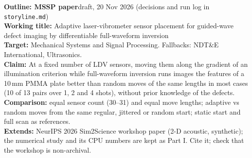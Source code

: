 \documentclass[10pt]{article}
\begin{document}
{\Large\bfseries Outline: MSSP paper}\hfill{\small draft, 20 Nov 2026 (decisions and run log in \texttt{storyline.md})}\\[2pt]
\textbf{Working title:} Adaptive laser-vibrometer sensor placement for guided-wave defect imaging by differentiable full-waveform inversion\\
\textbf{Target:} Mechanical Systems and Signal Processing. Fallbacks: NDT\&E International, Ultrasonics.\\
\textbf{Claim:} At a fixed number of LDV sensors, moving them along the gradient of an illumination criterion while full-waveform inversion runs images the features of a 10\,mm PMMA plate better than random moves of the same lengths in most cases (10 of 13 pairs over 1, 2 and 4 shots), without prior knowledge of the defects.\\
\textbf{Comparison:} equal sensor count (30--31) and equal move lengths; adaptive vs random moves from the same regular, jittered or random start; static start and full scan as references.\\
\textbf{Extends:} NeurIPS 2026 Sim2Science workshop paper (2-D acoustic, synthetic); the numerical study and its CPU numbers are kept as Part I. Cite it; check that the workshop is non-archival.
\end{document}
